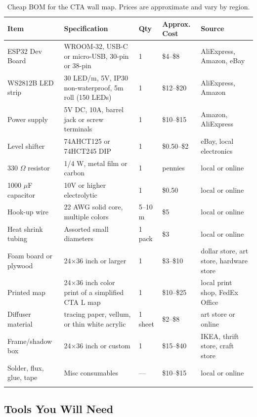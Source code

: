 \documentclass[11pt]{article}
\begin{document}
\begin{longtable}{p{3.2cm} p{4.6cm} p{1.4cm} p{2.0cm} p{3.0cm}}
\toprule
\textbf{Item} & \textbf{Specification} & \textbf{Qty} & \textbf{Approx. Cost} & \textbf{Source} \\
\midrule
ESP32 Dev Board & WROOM-32, USB-C or micro-USB, 30-pin or 38-pin & 1 & \$4--\$8 & AliExpress, Amazon, eBay \\
WS2812B LED strip & 30 LED/m, 5V, IP30 non-waterproof, 5m roll (150 LEDs) & 1 & \$12--\$20 & AliExpress, Amazon \\
Power supply & 5V DC, 10A, barrel jack or screw terminals & 1 & \$10--\$15 & Amazon, AliExpress \\
Level shifter & 74AHCT125 or 74HCT245 DIP & 1 & \$0.50--\$2 & eBay, local electronics \\
330 $\Omega$ resistor & 1/4 W, metal film or carbon & 1 & pennies & local or online \\
1000 $\mu$F capacitor & 10V or higher electrolytic & 1 & \$0.50 & local or online \\
Hook-up wire & 22 AWG solid core, multiple colors & 5--10 m & \$5 & local or online \\
Heat shrink tubing & Assorted small diameters & 1 pack & \$3 & local or online \\
Foam board or plywood & 24$\times$36 inch or larger & 1 & \$3--\$10 & dollar store, art store, hardware store \\
Printed map & 24$\times$36 inch color print of a simplified CTA L map & 1 & \$10--\$25 & local print shop, FedEx Office \\
Diffuser material & tracing paper, vellum, or thin white acrylic & 1 sheet & \$2--\$8 & art store or online \\
Frame/shadow box & 24$\times$36 inch or custom & 1 & \$15--\$40 & IKEA, thrift store, craft store \\
Solder, flux, glue, tape & Misc consumables & --- & \$10--\$15 & local or online \\
\bottomrule
\caption{Cheap BOM for the CTA wall map. Prices are approximate and vary by region.}
\label{tab:bom}
\end{longtable}

\subsection*{Tools You Will Need}
\end{document}
